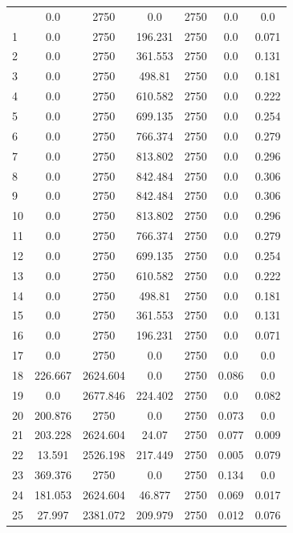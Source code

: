 \documentclass[]{article}
\begin{document}
\begin{longtable}{lcccccc}
		\endlastfoot
		0 & 0.0 & 2750 & 0.0 & 2750 & 0.0 & 0.0                  \\
		1 & 0.0 & 2750 & 196.231 & 2750 & 0.0 & 0.071            \\
		2 & 0.0 & 2750 & 361.553 & 2750 & 0.0 & 0.131            \\
		3 & 0.0 & 2750 & 498.81 & 2750 & 0.0 & 0.181             \\
		4 & 0.0 & 2750 & 610.582 & 2750 & 0.0 & 0.222            \\
		5 & 0.0 & 2750 & 699.135 & 2750 & 0.0 & 0.254            \\
		6 & 0.0 & 2750 & 766.374 & 2750 & 0.0 & 0.279            \\
		7 & 0.0 & 2750 & 813.802 & 2750 & 0.0 & 0.296            \\
		8 & 0.0 & 2750 & 842.484 & 2750 & 0.0 & 0.306            \\
		9 & 0.0 & 2750 & 842.484 & 2750 & 0.0 & 0.306            \\
		10 & 0.0 & 2750 & 813.802 & 2750 & 0.0 & 0.296           \\
		11 & 0.0 & 2750 & 766.374 & 2750 & 0.0 & 0.279           \\
		12 & 0.0 & 2750 & 699.135 & 2750 & 0.0 & 0.254           \\
		13 & 0.0 & 2750 & 610.582 & 2750 & 0.0 & 0.222           \\
		14 & 0.0 & 2750 & 498.81 & 2750 & 0.0 & 0.181            \\
		15 & 0.0 & 2750 & 361.553 & 2750 & 0.0 & 0.131           \\
		16 & 0.0 & 2750 & 196.231 & 2750 & 0.0 & 0.071           \\
		17 & 0.0 & 2750 & 0.0 & 2750 & 0.0 & 0.0                 \\
		18 & 226.667 & 2624.604 & 0.0 & 2750 & 0.086 & 0.0       \\
		19 & 0.0 & 2677.846 & 224.402 & 2750 & 0.0 & 0.082       \\
		20 & 200.876 & 2750 & 0.0 & 2750 & 0.073 & 0.0           \\
		21 & 203.228 & 2624.604 & 24.07 & 2750 & 0.077 & 0.009   \\
		22 & 13.591 & 2526.198 & 217.449 & 2750 & 0.005 & 0.079  \\
		23 & 369.376 & 2750 & 0.0 & 2750 & 0.134 & 0.0           \\
		24 & 181.053 & 2624.604 & 46.877 & 2750 & 0.069 & 0.017  \\
		25 & 27.997 & 2381.072 & 209.979 & 2750 & 0.012 & 0.076  \\

\end{longtable}
\end{document}
